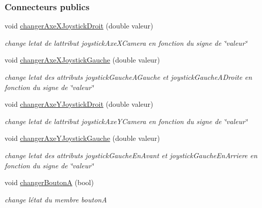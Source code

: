 \subsubsection*{Connecteurs publics}
\begin{DoxyCompactItemize}
\item 
void \hyperlink{class_manette_a37202e63cf8662fed5b3a2efc8eb99d1}{changer\+Axe\+X\+Joystick\+Droit} (double valeur)
\begin{DoxyCompactList}\small\item\em change l\textquotesingle{}etat de l\textquotesingle{}attribut joystick\+Axe\+X\+Camera en fonction du signe de \char`\"{}valeur\char`\"{} \end{DoxyCompactList}\item 
void \hyperlink{class_manette_a82a0d2535dd1dd9ea4021aa1fe71b1bc}{changer\+Axe\+X\+Joystick\+Gauche} (double valeur)
\begin{DoxyCompactList}\small\item\em change l\textquotesingle{}etat des attributs joystick\+Gauche\+A\+Gauche et joystick\+Gauche\+A\+Droite en fonction du signe de \char`\"{}valeur\char`\"{} \end{DoxyCompactList}\item 
void \hyperlink{class_manette_aaedc46e870b2731a79c5497296dba469}{changer\+Axe\+Y\+Joystick\+Droit} (double valeur)
\begin{DoxyCompactList}\small\item\em change l\textquotesingle{}etat de l\textquotesingle{}attribut joystick\+Axe\+Y\+Camera en fonction du signe de \char`\"{}valeur\char`\"{} \end{DoxyCompactList}\item 
void \hyperlink{class_manette_a6fd30466571a96d9789c54c8e8104ab2}{changer\+Axe\+Y\+Joystick\+Gauche} (double valeur)
\begin{DoxyCompactList}\small\item\em change l\textquotesingle{}etat des attributs joystick\+Gauche\+En\+Avant et joystick\+Gauche\+En\+Arriere en fonction du signe de \char`\"{}valeur\char`\"{} \end{DoxyCompactList}\item 
void \hyperlink{class_manette_aadf275d6bac238d48f8879d264bbc868}{changer\+BoutonA} (bool)
\begin{DoxyCompactList}\small\item\em change l\textquotesingle{}état du membre boutonA \end{DoxyCompactList}\item 

\end{DoxyCompactItemize}
